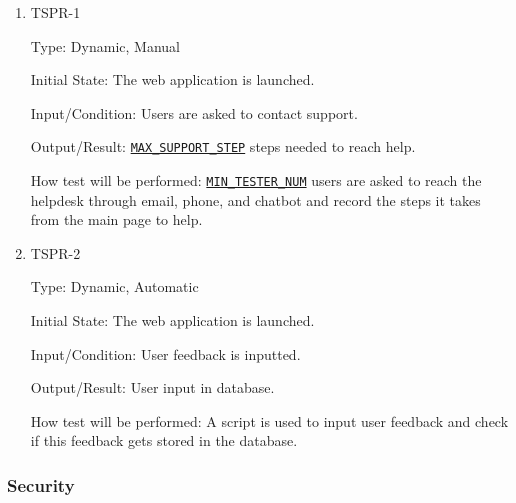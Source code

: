 \documentclass[12pt, titlepage]{article}
\begin{document}
\begin{enumerate}
\item{TSPR-1\\}\label{TSPR-1}

Type: Dynamic, Manual
					
Initial State: The web application is launched.
					
Input/Condition: Users are asked to contact support.
					
Output/Result: \hyperref[MAX_SUPPORT_STEP]{\texttt{MAX\_SUPPORT\_STEP}} steps needed to reach help.
					
How test will be performed: \hyperref[MIN_TESTER_NUM]{\texttt{MIN\_TESTER\_NUM}} users are asked to reach the helpdesk through email, phone, and chatbot and record the steps it takes from the main page to help.


\item{TSPR-2\\}\label{TSPR-2}

Type: Dynamic, Automatic
					
Initial State: The web application is launched.
					
Input/Condition: User feedback is inputted.
					
Output/Result: User input in database.
					
How test will be performed: A script is used to input user feedback and check if this feedback gets stored in the database.

\end{enumerate}

\subsubsection{Security}
\end{document}
